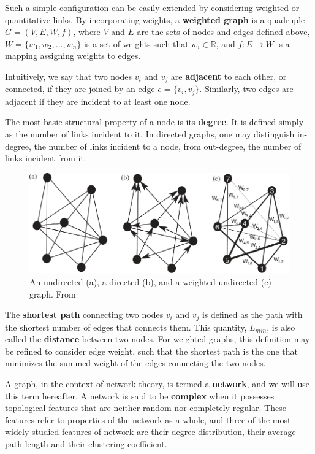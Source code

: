 Such a simple configuration can be easily extended by considering weighted or quantitative links. By incorporating weights, a \textbf{weighted graph} is a quadruple $G = (V,E,W,f)$, where $V$ and $E$ are the sets of nodes and edges defined above, $W = \{w_1,w_2,...,w_n\}$ is a set of weights such that $w_i \in \mathbb{R}$, and $f: E \rightarrow W$ is a mapping assigning weights to edges.

Intuitively, we say that two nodes $v_i$ and $v_j$ are \textbf{adjacent} to each other, or connected, if they are joined by an edge $e = \{v_i,v_j\}$. Similarly, two edges are adjacent if they are incident to at least one node.

The most basic structural property of a node is its \textbf{degree}. It is defined simply as the number of links incident to it. In directed graphs, one may distinguish in-degree, the number of links incident to a node, from out-degree, the number of links incident from it.

\begin{figure}[ht]
\includegraphics[width=\textwidth]{./Figures/intro/network_theory/graph_properties_Boccaletti2006_horizontal.png}
\caption[Three types of graphs]{An undirected (a), a directed (b), and a weighted undirected (c) graph. From \cite{Boccaletti2006}}
\label{fig:network_types}
\end{figure}

The \textbf{shortest path} connecting two nodes $v_i$ and $v_j$ is defined as the path with the shortest number of edges that connects them. This quantity, $L_{min}$, is also called the \textbf{distance} between two nodes. For weighted graphs, this definition may be refined to consider edge weight, such that the shortest path is the one that minimizes the summed weight of the edges connecting the two nodes.

A graph, in the context of network theory, is termed a \textbf{network}, and we will use this term hereafter. A network is said to be \textbf{complex} when it possesses topological features that are neither random nor completely regular. These features refer to properties of the network as a whole, and three of the most widely studied features of network are their degree distribution, their average path length and their clustering coefficient.

